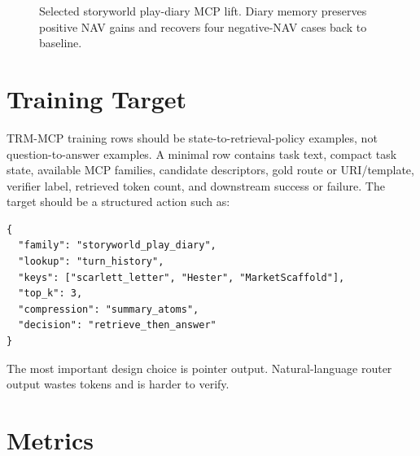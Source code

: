 \documentclass[11pt]{article}
\begin{document}
\begin{figure}[t]
\centering
{}
\caption{Selected storyworld play-diary MCP lift. Diary memory preserves positive NAV gains and recovers four negative-NAV cases back to baseline.}
\label{fig:diary}
\end{figure}

\section{Training Target}

TRM-MCP training rows should be state-to-retrieval-policy examples, not question-to-answer examples. A minimal row contains task text, compact task state, available MCP families, candidate descriptors, gold route or URI/template, verifier label, retrieved token count, and downstream success or failure. The target should be a structured action such as:

\begin{verbatim}
{
  "family": "storyworld_play_diary",
  "lookup": "turn_history",
  "keys": ["scarlett_letter", "Hester", "MarketScaffold"],
  "top_k": 3,
  "compression": "summary_atoms",
  "decision": "retrieve_then_answer"
}
\end{verbatim}

The most important design choice is pointer output. Natural-language router output wastes tokens and is harder to verify.

\section{Metrics}
\end{document}
